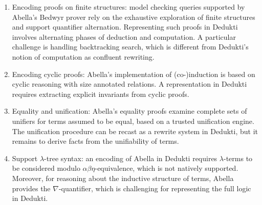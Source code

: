 \begin{enumerate}
\item Encoding proofs on finite structures: model checking queries supported by
  Abella's Bedwyr prover rely on the exhaustive exploration of finite structures
  and support quantifier alternation. Representing such proofs in Dedukti
  involves alternating phases of deduction and computation. A particular
  challenge is handling backtracking search, which is different from Dedukti's
  notion of computation as confluent rewriting.
\item Encoding cyclic proofs: Abella's implementation of (co-)induction is based
  on cyclic reasoning with size annotated relations. A representation in Dedukti
  requires extracting explicit invariants from cyclic proofs.
\item Equality and unification: Abella's equality proofs examine complete sets
  of unifiers for terms assumed to be equal, based on a trusted unification
  engine. The unification procedure can be recast as a rewrite system in
  Dedukti, but it remains to derive facts from the unifiability of terms.
\item Support $\lambda$-tree syntax: an encoding of Abella in Dedukti requires
  $\lambda$-terms to be considered modulo $\alpha\beta\eta$-equivalence, which
  is not natively supported. Moreover, for reasoning about the inductive
  structure of terms, Abella provides the $\nabla$-quantifier, which is
  challenging for representing the full logic in Dedukti.  
\end{enumerate}





